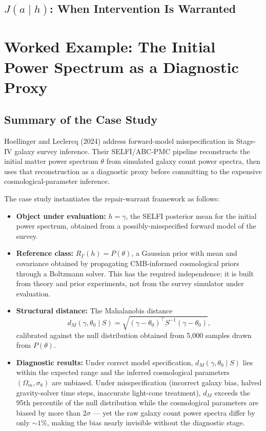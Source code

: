 \documentclass[12pt,a4paper,twoside,openright]{book}
\theoremstyle{plain}
\theoremstyle{definition}
\theoremstyle{remark}
\newcommand{\RGam}{R_\Gamma}
\newcommand{\Repobj}{J}
\begin{document}
\subsection{\texorpdfstring{$\Repobj(a\mid h)$}{J(a|h)}: When Intervention Is Warranted}

\section{Worked Example: The Initial Power Spectrum as a Diagnostic Proxy \texorpdfstring{\cite{hoellinger2024diagnosing}}{}}


\subsection{Summary of the Case Study}

Hoellinger and Leclercq (2024) \cite{hoellinger2024diagnosing} address forward-model misspecification in Stage-IV galaxy survey inference. Their SELFI/ABC-PMC pipeline reconstructs the initial matter power spectrum $\theta$ from simulated galaxy count power spectra, then uses that reconstruction as a diagnostic proxy before committing to the expensive cosmological-parameter inference.

The case study instantiates the repair-warrant framework as follows:

\begin{itemize}
\item \textbf{Object under evaluation:} $h = \gamma$, the SELFI posterior mean for the initial power spectrum, obtained from a possibly-misspecified forward model of the survey.

\item \textbf{Reference class:} $\RGam(h) = P(\theta)$, a Gaussian prior with mean and covariance obtained by propagating CMB-informed cosmological priors through a Boltzmann solver. This has the required independence: it is built from theory and prior experiments, not from the survey simulator under evaluation.

\item \textbf{Structural distance:} The Mahalanobis distance
\[
d_M(\gamma, \theta_0 \mid S) = \sqrt{(\gamma - \theta_0)^\top S^{-1} (\gamma - \theta_0)},
\]
calibrated against the null distribution obtained from 5,000 samples drawn from $P(\theta)$.

\item \textbf{Diagnostic results:} Under correct model specification, $d_M(\gamma, \theta_0 \mid S)$ lies within the expected range and the inferred cosmological parameters $(\Omega_m, \sigma_8)$ are unbiased. Under misspecification (incorrect galaxy bias, halved gravity-solver time steps, inaccurate light-cone treatment), $d_M$ exceeds the 95th percentile of the null distribution while the cosmological parameters are biased by more than $2\sigma$ --- yet the raw galaxy count power spectra differ by only $\sim 1\%$, making the bias nearly invisible without the diagnostic stage.
\end{itemize}
\end{document}

